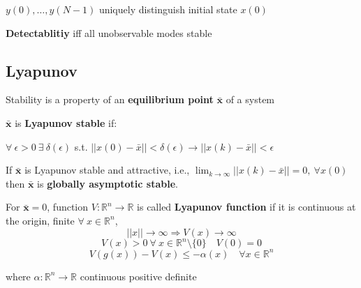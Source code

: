 $y(0), \dots, y(N-1)$
uniquely distinguish initial state $x(0)$

\textbf{Detectablitiy} iff all unobservable modes stable

\subsection{Lyapunov}

Stability is a property of an
\textbf{equilibrium point} $\bar{\mathbf{x}}$
of a system

\begin{definition}
	$\bar{\mathbf{x}}$ is \textbf{Lyapunov stable} if:

	$\forall\ \epsilon>0\ \exists\ \delta(\epsilon)$ s.t.
	$\lvert\lvert x(0) - \bar{x} \rvert\rvert < \delta(\epsilon) \to
		\lvert\lvert x(k) - \bar{x} \rvert\rvert < \epsilon$
\end{definition}

\begin{definition}
	If $\bar{\mathbf{x}}$ is Lyapunov stable and attractive, i.e.,
	$\lim_{k\to\infty} ||x(k)-\bar{x}||=0,\ \forall x(0)$
	then $\bar{\mathbf{x}}$ is \textbf{globally asymptotic stable}.
\end{definition}

\begin{sstFrame}[RoyalBlue!50]
	\begin{definition}
		For  $\bar{\mathbf{x}}=0$,
		function $V:\mathbb{R}^n\to \mathbb{R}$ is called
		\textbf{Lyapunov function} if it is continuous at the origin,
		finite $\forall\ x\in \mathbb{R}^{n}$,
		\[
			||x||\to\infty\Rightarrow V(x)\to\infty
		\]
		\[
			V(x)>0\ \forall\ x\in\mathbb{R}^n \setminus\{0\}\quad V(0)=0
		\]
		\[
			V(g(x)) - V(x) \leq -\alpha(x) \quad \forall x \in \mathbb{R}^n
		\]

		where $\alpha:\mathbb{R}^n\to \mathbb{R}$
		continuous positive definite
	\end{definition}
\end{sstFrame}

